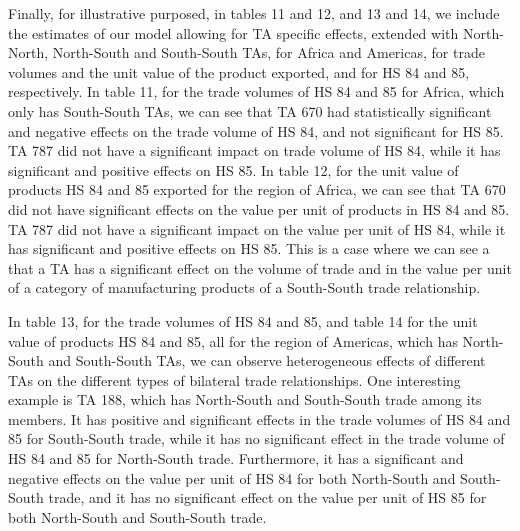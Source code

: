 Finally, for illustrative purposed, in tables 11 and 12, and 13 and 14,
we include the estimates of our model allowing for TA specific effects,
extended with North-North, North-South and South-South TAs, for Africa
and Americas, for trade volumes and the unit value of the product
exported, and for HS 84 and 85, respectively. In table 11, for the trade
volumes of HS 84 and 85 for Africa, which only has South-South TAs, we
can see that TA 670 had statistically significant and negative effects
on the trade volume of HS 84, and not significant for HS 85. TA 787 did
not have a significant impact on trade volume of HS 84, while it has
significant and positive effects on HS 85. In table 12, for the unit
value of products HS 84 and 85 exported for the region of Africa, we can
see that TA 670 did not have significant effects on the value per unit
of products in HS 84 and 85. TA 787 did not have a significant impact on
the value per unit of HS 84, while it has significant and positive
effects on HS 85. This is a case where we can see a that a TA has a
significant effect on the volume of trade and in the value per unit of a
category of manufacturing products of a South-South trade relationship.

In table 13, for the trade volumes of HS 84 and 85, and table 14 for the
unit value of products HS 84 and 85, all for the region of Americas,
which has North-South and South-South TAs, we can observe heterogeneous
effects of different TAs on the different types of bilateral trade
relationships. One interesting example is TA 188, which has North-South
and South-South trade among its members. It has positive and significant
effects in the trade volumes of HS 84 and 85 for South-South trade,
while it has no significant effect in the trade volume of HS 84 and 85
for North-South trade. Furthermore, it has a significant and negative
effects on the value per unit of HS 84 for both North-South and
South-South trade, and it has no significant effect on the value per
unit of HS 85 for both North-South and South-South trade.
%
%
%
%
%
%
%
%
%
%
%
%
%
\FloatBarrier

%
